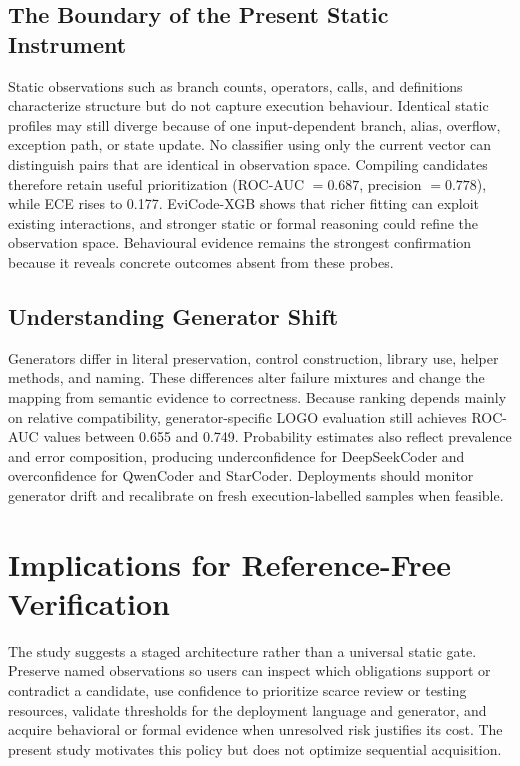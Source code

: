 \documentclass[conference]{IEEEtran}
\begin{document}
\subsection{The Boundary of the Present Static Instrument}
Static observations such as branch counts, operators, calls, and definitions characterize structure but do not capture execution behaviour. Identical static profiles may still diverge because of one input-dependent branch, alias, overflow, exception path, or state update. No classifier using only the current vector can distinguish pairs that are identical in observation space. Compiling candidates therefore retain useful prioritization (ROC-AUC $=0.687$, precision $=0.778$), while ECE rises to 0.177. EviCode-XGB shows that richer fitting can exploit existing interactions, and stronger static or formal reasoning could refine the observation space. Behavioural evidence remains the strongest confirmation because it reveals concrete outcomes absent from these probes.

\subsection{Understanding Generator Shift}
Generators differ in literal preservation, control construction, library use, helper methods, and naming. These differences alter failure mixtures and change the mapping from semantic evidence to correctness. Because ranking depends mainly on relative compatibility, generator-specific LOGO evaluation still achieves ROC-AUC values between 0.655 and 0.749. Probability estimates also reflect prevalence and error composition, producing underconfidence for DeepSeekCoder and overconfidence for QwenCoder and StarCoder. Deployments should monitor generator drift and recalibrate on fresh execution-labelled samples when feasible.

\section{Implications for Reference-Free Verification}
The study suggests a staged architecture rather than a universal static gate. Preserve named observations so users can inspect which obligations support or contradict a candidate, use confidence to prioritize scarce review or testing resources, validate thresholds for the deployment language and generator, and acquire behavioral or formal evidence when unresolved risk justifies its cost. The present study motivates this policy but does not optimize sequential acquisition.
\end{document}
